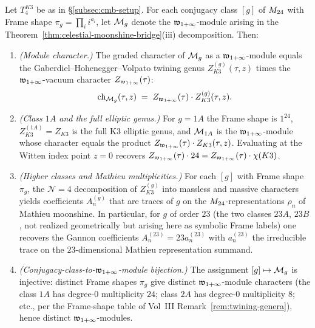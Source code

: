 \begin{theorem}
\label{thm:mathieu-celestial-correspondence}
Let $T_4^{K3}$ be as in \S\ref{subsec:cmb-setup}. For each conjugacy
class $[g]$ of $M_{24}$ with Frame shape
$\pi_g = \prod_i i^{a_i}$, let $\mathcal M_g$ denote the $\mathfrak w_{1+\infty}$-module
arising in the
Theorem~\ref{thm:celestial-moonshine-bridge}(iii) decomposition.
Then:
\begin{enumerate}[label=\textup{(\roman*)}]
\item \emph{(Module character.)}
The graded character of $\mathcal M_g$ as a $\mathfrak w_{1+\infty}$-module equals the
Gaberdiel--Hohenegger--Volpato twining genus $Z_{K3}^{(g)}(\tau, z)$
times the $\mathfrak w_{1+\infty}$-vacuum character $Z_{\mathfrak w_{1+\infty}}(\tau)$:
\[
\mathrm{ch}_{\mathcal M_g}(\tau, z)
\;=\;
Z_{\mathfrak w_{1+\infty}}(\tau) \cdot Z_{K3}^{(g)}(\tau, z).
\]
\item \emph{(Class $1A$ and the full elliptic genus.)}
For $g = 1A$ the Frame shape is $1^{24}$, $Z_{K3}^{(1A)} = Z_{K3}$ is
the full K3 elliptic genus, and $\mathcal M_{1A}$ is the $\mathfrak w_{1+\infty}$-module whose
character equals the product $Z_{\mathfrak w_{1+\infty}}(\tau) \cdot Z_{K3}(\tau, z)$.
Evaluating at the Witten index point $z = 0$ recovers
$Z_{\mathfrak w_{1+\infty}}(\tau) \cdot 24 = Z_{\mathfrak w_{1+\infty}}(\tau) \cdot \chi(K3)$.
\item \emph{(Higher classes and Mathieu multiplicities.)}
For each $[g]$ with Frame shape $\pi_g$, the $\mathcal{N}{=}4$
decomposition of $Z_{K3}^{(g)}$ into massless and massive characters
yields coefficients $A_n^{(g)}$ that are traces of $g$ on the
$M_{24}$-representations $\rho_n$ of Mathieu moonshine. In
particular, for $g$ of order $23$ (the two classes $23A$, $23B$, not
realized geometrically but arising here as symbolic Frame labels) one
recovers the Gannon coefficients
$A_n^{(23)} = 23 a_n^{(23)}$ with $a_n^{(23)}$ the irreducible trace on
the $23$-dimensional Mathieu representation summand.
\item \emph{(Conjugacy-class-to-$\mathfrak w_{1+\infty}$-module bijection.)}
The assignment $[g] \mapsto \mathcal M_g$ is injective: distinct Frame shapes
$\pi_g$ give distinct $\mathfrak w_{1+\infty}$-module characters (the class $1A$ has
degree-$0$ multiplicity $24$; class $2A$ has degree-$0$ multiplicity
$8$; etc., per the Frame-shape table of Vol~III
Remark~\ref{rem:twining-genera}), hence distinct $\mathfrak w_{1+\infty}$-modules.
\end{enumerate}
\end{theorem}

